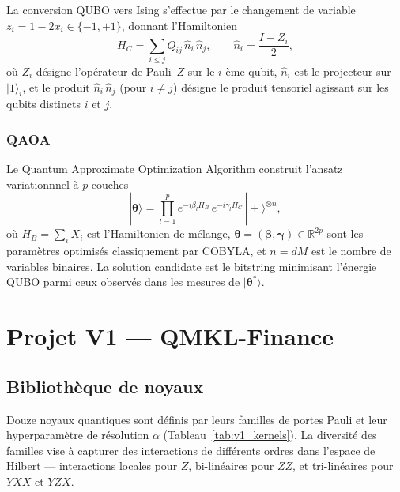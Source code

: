 \documentclass[12pt,a4paper]{article}
\begin{document}
La conversion QUBO vers Ising s'effectue par le changement de variable
$z_i = 1 - 2x_i \in \{-1, +1\}$, donnant l'Hamiltonien
\begin{equation}
  H_C = \sum_{i \leq j} Q_{ij}\,\hat{n}_i\,\hat{n}_j,
  \qquad \hat{n}_i = \frac{I - Z_i}{2},
  \label{eq:ising}
\end{equation}
où $Z_i$ désigne l'opérateur de Pauli~$Z$ sur le $i$-ème qubit,
$\hat{n}_i$ est le projecteur sur $|1\rangle_i$,
et le produit $\hat{n}_i\,\hat{n}_j$ (pour $i \neq j$) désigne le produit
tensoriel agissant sur les qubits distincts $i$ et $j$.

\subsubsection{QAOA}

Le Quantum Approximate Optimization Algorithm \cite{farhi2014} construit
l'ansatz variationnnel à $p$ couches
\begin{equation}
  |\bm{\theta}\rangle =
  \prod_{l=1}^{p} e^{-i\beta_l H_B}\,e^{-i\gamma_l H_C}\,|+\rangle^{\otimes n},
  \label{eq:qaoa}
\end{equation}
où $H_B = \sum_i X_i$ est l'Hamiltonien de mélange,
$\bm{\theta} = (\bm{\beta}, \bm{\gamma}) \in \mathbb{R}^{2p}$ sont les
paramètres optimisés classiquement par COBYLA, et $n = dM$ est le nombre
de variables binaires.
La solution candidate est le bitstring minimisant l'énergie QUBO parmi
ceux observés dans les mesures de $|\bm{\theta}^*\rangle$.

\section{Projet V1 — QMKL-Finance}
\label{sec:v1}

\subsection{Bibliothèque de noyaux}
\label{sec:v1_kernels}

Douze noyaux quantiques sont définis par leurs familles de portes Pauli
et leur hyperparamètre de résolution $\alpha$
(Tableau~\ref{tab:v1_kernels}).
La diversité des familles vise à capturer des interactions de différents
ordres dans l'espace de Hilbert — interactions locales pour $Z$,
bi-linéaires pour $ZZ$, et tri-linéaires pour $YXX$ et $YZX$.
\end{document}
